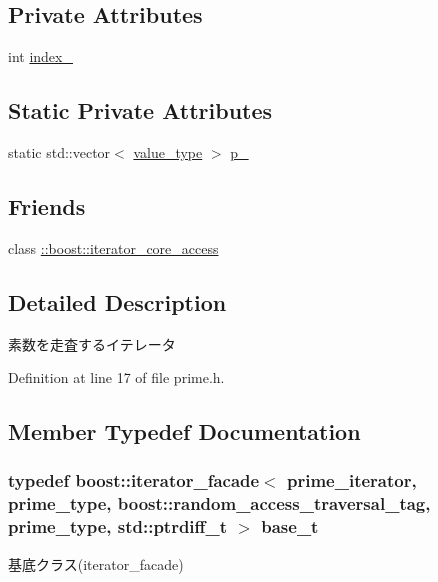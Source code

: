 \subsection*{\-Private \-Attributes}
\begin{DoxyCompactItemize}
\item 
int \hyperlink{classyuh_1_1range__detail_1_1prime__iterator_aaaf1ac02dfa554a3cdffc647d512a77b}{index\-\_\-}
\end{DoxyCompactItemize}
\subsection*{\-Static \-Private \-Attributes}
\begin{DoxyCompactItemize}
\item 
static std\-::vector$<$ \hyperlink{classyuh_1_1range__detail_1_1prime__iterator_ab7468d4ed49b58c84d6c1b71779fb43e}{value\-\_\-type} $>$ \hyperlink{classyuh_1_1range__detail_1_1prime__iterator_aff6d0a0fbc14123c0fca5a0c05d2e68c}{p\-\_\-}
\end{DoxyCompactItemize}
\subsection*{\-Friends}
\begin{DoxyCompactItemize}
\item 
class \hyperlink{classyuh_1_1range__detail_1_1prime__iterator_a986bf0deaa7559f361d03122eeea4c86}{\-::boost\-::iterator\-\_\-core\-\_\-access}
\end{DoxyCompactItemize}


\subsection{\-Detailed \-Description}
素数を走査するイテレータ 

\-Definition at line 17 of file prime.\-h.



\subsection{\-Member \-Typedef \-Documentation}
\hypertarget{classyuh_1_1range__detail_1_1prime__iterator_af6bf48039295b29ac1f86bd776f4a29a}{
\subsubsection[{base\-\_\-t}]{\setlength{\rightskip}{0pt plus 5cm}typedef boost\-::iterator\-\_\-facade$<$ {\bf prime\-\_\-iterator}, {\bf prime\-\_\-type}, boost\-::random\-\_\-access\-\_\-traversal\-\_\-tag, {\bf prime\-\_\-type}, std\-::ptrdiff\-\_\-t $>$ {\bf base\-\_\-t}}}\label{d9/dc8/classyuh_1_1range__detail_1_1prime__iterator_af6bf48039295b29ac1f86bd776f4a29a}
基底クラス(iterator\-\_\-facade) 

